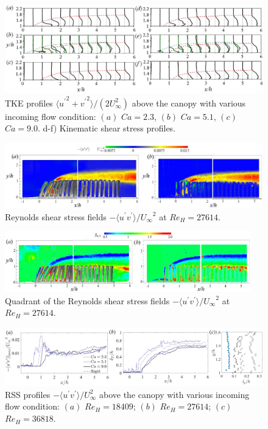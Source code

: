 \documentclass[lineno,authoryear]{FLO_v1}%
\theoremstyle{definition}
\begin{document}
\begin{figure}
	\centerline{\includegraphics[width=1\textwidth]{TKE_uv_profiles}}
	\caption{TKE profiles $ \langle {u^{\prime}}^2 + {v^{\prime}}^2 \rangle/(2U_{\infty}^2)$ above the canopy with various incoming flow condition: $(a)$ $Ca = 2.3$, $(b)$ $Ca = 5.1$, $(c)$ $Ca = 9.0$. d-f) Kinematic shear stress profiles.  }
	\label{TKE_profile}
\end{figure}

\begin{figure}
	\centerline{\includegraphics[width=1\textwidth]{uw}}
	\caption{Reynolds shear stress fields $-\langle u^{\prime} v^{\prime} \rangle  /{U_{\infty}}^2$ at $Re_H = 27614$. }
	\label{RSS_contour}
\end{figure}

\begin{figure}
	\centerline{\includegraphics[width=0.95\textwidth]{Qd}}
	\caption{Quadrant of the Reynolds shear stress fields $-\langle u^{\prime} v^{\prime} \rangle  /{U_{\infty}}^2$ at $Re_H = 27614$. }
	\label{RSS_contour}
\end{figure}

\begin{figure}
	\centerline{\includegraphics[width=\textwidth]{uw_d_ly}}
	\caption{RSS profiles $-\langle u^{\prime} v^{\prime} \rangle/ U_{\infty}^{2}$ above the canopy with various incoming flow condition: $(a)$ $Re_H = 18409$; $(b)$ $Re_H = 27614$; $(c)$ $Re_H = 36818$. }
	\label{RSS_profile}
\end{figure}
\end{document}
